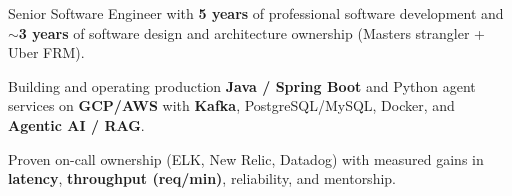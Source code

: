 \begin{zitemize}
    \item Senior Software Engineer with \textbf{5 years} of professional software development and \textbf{$\sim$3 years} of software design and architecture ownership (Masters strangler + Uber FRM).
    \item Building and operating production \textbf{Java / Spring Boot} and Python agent services on \textbf{GCP/AWS} with \textbf{Kafka}, PostgreSQL/MySQL, Docker, and \textbf{Agentic AI / RAG}.
    \item Proven on-call ownership (ELK, New Relic, Datadog) with measured gains in \textbf{latency}, \textbf{throughput (req/min)}, reliability, and mentorship.
\end{zitemize}
